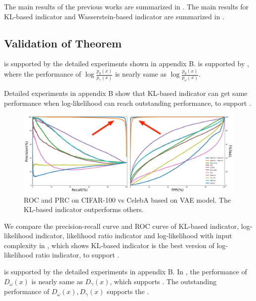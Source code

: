 \documentclass[letterpaper]{article} %
\begin{document}
The main results of the previous works are summarized in . The main results for KL-based indicator and Wasserstein-based indicator are summarized in . 

\subsection{Validation of Theorem}

 is supported by the detailed experiments shown in appendix B.  is supported by , where the performance of $\log \frac{p_\theta(x)}{p_\gamma(x)}$ is nearly same as $\log \frac{p_\theta(x)}{p_\omega(x)}$. 

Detailed experiments in appendix B show that KL-based indicator can get same performance when log-likelihood can reach outstanding performance, to support . 

\begin{figure}[t]
	\includegraphics[width=0.9\columnwidth]{roc_prc}
	\caption{ROC and PRC on CIFAR-100 vs CelebA based on VAE model. The KL-based indicator outperforms others. }
	\label{fig5}
\end{figure}

We compare the precision-recall curve and ROC curve of KL-based indicator, log-likelihood indicator, likelihood ratio indicator and log-likelihood with input complexity in , which shows KL-based indicator is the best version of log-likelihood ratio indicator, to support . 

 is supported by the detailed experiments in appendix B. In , the performance of $D_\omega(x)$ is nearly same as $D_\gamma(x)$, which supports . The outstanding performance of $D_\omega(x), D_\gamma(x)$ supports the . 
\end{document}
